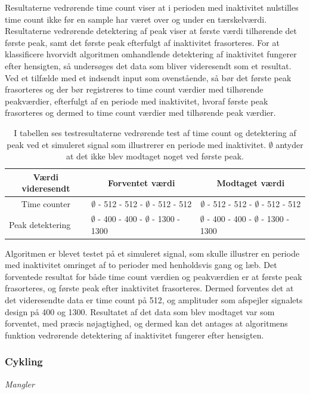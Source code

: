 Resultaterne vedrørende time count viser at i perioden med inaktivitet nulstilles time count ikke før en sample har været over og under en tærskelværdi. Resultaterne vedrørende detektering af peak viser at første værdi tilhørende det første peak, samt det første peak efterfulgt af inaktivitet frasorteres. For at klassificere hvorvidt algoritmen omhandlende detektering af inaktivitet fungerer efter hensigten, så undersøges det data som bliver videresendt som et resultat. Ved et tilfælde med et indsendt input som ovenstående, så bør det første peak frasorteres og der bør registreres to time count værdier med tilhørende peakværdier, efterfulgt af en periode med inaktivitet, hvoraf første peak frasorteres og dermed to time count værdier med tilhørende peak værdier.

\begin{table}[H]
	\centering
	\begin{tabular}{ccc}
		\hline
		\rowcolor[HTML]{C0C0C0} 
		Værdi videresendt & Forventet værdi & Modtaget værdi \\ \hline
		Time counter & $\emptyset$ - 512 - 512 - $\emptyset$ - 512 - 512 & $\emptyset$ - 512 - 512 - $\emptyset$ - 512 - 512 \\ \hline
		\multicolumn{1}{l}{Peak detektering} & \multicolumn{1}{l}{$\emptyset$ - 400 - 400 - $\emptyset$ - 1300 - 1300} & \multicolumn{1}{l}{$\emptyset$ - 400 - 400 - $\emptyset$ - 1300 - 1300} \\ \hline
	\end{tabular}
	\caption{I tabellen ses testresultaterne vedrørende test af time count og detektering af peak ved et simuleret signal som illustrerer en periode med inaktivitet. $\emptyset$ antyder at det ikke blev modtaget noget ved første peak.}
	\label{tab:test_inaktiv}
\end{table}\vspace{-0.5cm}
Algoritmen er blevet testet på et simuleret signal, som skulle illustrer en periode med inaktivitet omringet af to perioder med henholdsvis gang og læb. Det forventede resultat for både time count værdien og peakværdien er at første peak frasorteres, og første peak efter inaktivitet frasorteres. Dermed forventes det at det videresendte data er time count på 512, og amplituder som afspejler signalets design på 400 og 1300. Resultatet af det data som blev modtaget var som forventet, med præcis nøjagtighed, og dermed kan det antages at algoritmens funktion vedrørende detektering af inaktivitet fungerer efter hensigten. 

\subsubsection{Cykling}
\textit{Mangler}

